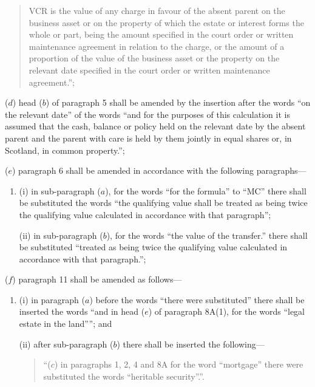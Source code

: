 \documentclass[12pt,a4paper]{article}
\begin{document}
\begin{enumerate}
\begin{enumerate}
\begin{quotation}
\begin{enumerate}
VCR is the value of any charge in favour of the absent parent on the business asset or on the property of which the estate or interest forms the whole or part, being the amount specified in the court order or written maintenance agreement in relation to the charge, or the amount of a proportion of the value of the business asset or the property on the relevant date specified in the court order or written maintenance agreement.”;
\end{enumerate}
\end{quotation}
\end{enumerate}

($d$) head ($b$) of paragraph 5 shall be amended by the insertion after the words “on the relevant date” of the words “and for the purposes of this calculation it is assumed that the cash, balance or policy held on the relevant date by the absent parent and the parent with care is held by them jointly in equal shares or, in Scotland, in common property.”;

($e$) paragraph 6 shall be amended in accordance with the following paragraphs—
\begin{enumerate}\item[]
(i) in sub-paragraph ($a$), for the words “for the formula” to “MC” there shall be substituted the words “the qualifying value shall be treated as being twice the qualifying value calculated in accordance with that paragraph”;

(ii) in sub-paragraph ($b$), for the words “the value of the transfer.” there shall be substituted “treated as being twice the qualifying value calculated in accordance with that paragraph.”;
\end{enumerate}

($f$) paragraph 11 shall be amended as follows—
\begin{enumerate}\item[]
(i) in paragraph ($a$) before the words “there were substituted” there shall be inserted the words “and in head ($e$) of paragraph 8A(1), for the words “legal estate in the land””; and

(ii) after sub-paragraph ($b$) there shall be inserted the following—
\begin{quotation}
“($c$) in paragraphs 1, 2, 4 and 8A for the word “mortgage” there were substituted the words “heritable security”.”.
\end{quotation}
\end{enumerate}
\end{enumerate}
\end{document}
